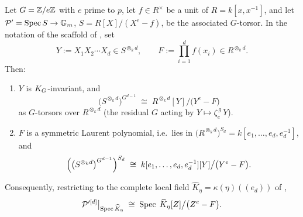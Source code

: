 \begin{prop}\label{prop:kummer_cover_identification}
    Let $G = \mathbb{Z}/e\mathbb{Z}$ with $e$ prime to $p$, let $f \in R^\times$ be a unit of
    $R = k[x, x^{-1}]$, and let $\mathcal{P}' = \operatorname{Spec} S \to \mathbb{G}_m$, $S = R[X]/(X^e - f)$, be
    the associated $G$-torsor. In the notation of the scaffold of
    , set
    \[
        Y := X_1 X_2 \cdots X_d \in S^{\otimes_k d},
        \qquad
        F := \prod_{i=1}^{d} f(x_i) \in R^{\otimes_k d}.
    \]
    Then:
    \begin{enumerate}
        \item \label{item:kummer_cover_invariance} $Y$ is $K_{G}$-invariant, and
        \[
            \bigl(S^{\otimes_k d}\bigr)^{G^{d-1}}
            \;\cong\;
            R^{\otimes_k d}[Y]\big/\bigl(Y^e - F\bigr)
        \]
        as $G$-torsors over $R^{\otimes_k d}$ (the residual $G$ acting by
        $Y \mapsto \zeta_e^{\,g}\, Y$).
        \item \label{item:kummer_cover_symmetry} $F$ is a symmetric Laurent
        polynomial, i.e.\ lies in
        $\bigl(R^{\otimes_k d}\bigr)^{S_d} = k[e_1, \dots, e_d, e_d^{-1}]$, and
        \[
            \Bigl(\bigl(S^{\otimes_k d}\bigr)^{G^{d-1}}\Bigr)^{S_d}
            \;\cong\;
            k[e_1, \dots, e_d, e_d^{-1}][Y]\big/\bigl(Y^e - F\bigr).
        \]
    \end{enumerate}
    Consequently, restricting to the complete local field
    $\widehat K_\eta = \kappa(\eta)((e_d))$ of
    ,
    \[
        \mathcal{P}'^{[d]}\big|_{\operatorname{Spec} \widehat K_\eta}
        \;\cong\;
        \operatorname{Spec}\; \widehat K_\eta[Z]\big/\bigl(Z^e - F\bigr).
    \]
\end{prop}
